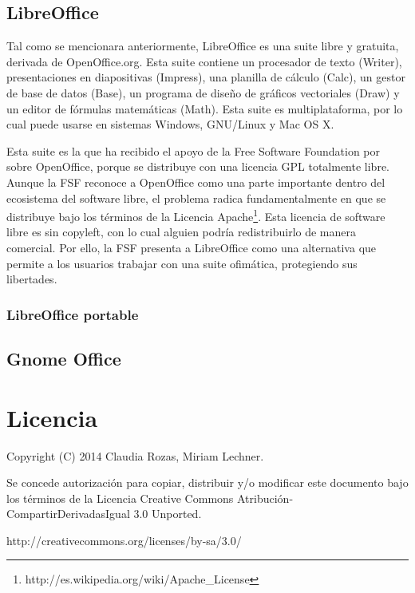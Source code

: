 \documentclass[12pt]{article}
\begin{document}
\subsection*{LibreOffice}

Tal como se mencionara anteriormente, LibreOffice es una suite libre y gratuita, derivada de OpenOffice.org. Esta suite contiene un procesador de texto (Writer), presentaciones en diapositivas (Impress), una planilla de cálculo (Calc), un gestor de base de datos (Base), un programa de diseño de gráficos vectoriales (Draw) y un editor de fórmulas matemáticas (Math). 
Esta suite es multiplataforma, por lo cual puede usarse en sistemas Windows, GNU/Linux y Mac OS X.

Esta suite es la que ha recibido el apoyo de la Free Software Foundation por sobre OpenOffice, porque se distribuye con una licencia GPL totalmente libre. Aunque la FSF reconoce a OpenOffice como una parte importante dentro del ecosistema del software libre, el problema radica fundamentalmente en que se distribuye bajo los términos de la Licencia Apache\footnote{http://es.wikipedia.org/wiki/Apache\_License}. Esta licencia de software libre es sin copyleft, con lo cual alguien podría redistribuirlo de manera comercial. Por ello, la FSF presenta a LibreOffice como una alternativa que permite a los usuarios trabajar con una suite ofimática, protegiendo sus libertades.   

\subsubsection*{LibreOffice portable}

\subsection*{Gnome Office}



\section*{Licencia}
Copyright (C) 2014 Claudia Rozas, Miriam Lechner.

Se concede autorización para copiar, distribuir y/o modificar este documento
bajo los términos de la Licencia Creative Commons Atribución-CompartirDerivadasIgual 3.0 Unported. 

http://creativecommons.org/licenses/by-sa/3.0/
\end{document}
